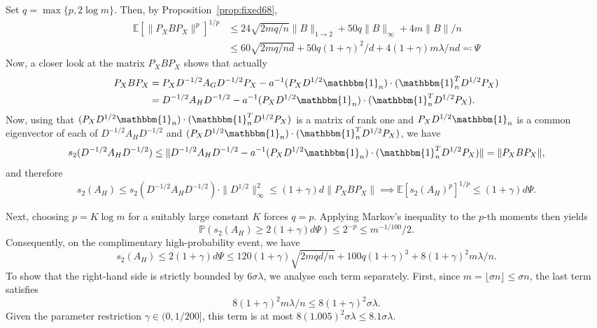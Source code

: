 \documentclass[reqno,a4paper]{amsart}
\theoremstyle{definition}
\begin{document}
Set $q = \max\{p,2\log m\}$. 
Then, by Proposition~\ref{prop:fixed68},
\[
\begin{split}
        \mathbb{E}[\|P_XBP_X\|^p]^{1/p}
        &\le
        24\sqrt{2mq/n}\|B\|_{1\to 2}+50q\|B\|_{\infty}+4m\|B\|/n\\
        &\le 60\sqrt{2mq/nd}+50q(1+\gamma)^2/d+4(1+\gamma)m\lambda/nd \eqqcolon \Psi
\end{split}
\]
Now, a closer look at the matrix $P_XB P_X$ shows that actually
\begin{align*}
P_XB P_X 
&= P_X D^{-1/2} A_G D^{-1/2} P_X - a^{-1} (P_X D^{1/2} \mathbbm{1}_n)\cdot (\mathbbm{1}_n^T D^{1/2} P_X)\\ 
&= D^{-1/2} A_H D^{-1/2} - a^{-1} (P_X D^{1/2} \mathbbm{1}_n)\cdot (\mathbbm{1}_n^T D^{1/2} P_X).
\end{align*}
Now, using that $(P_X D^{1/2} \mathbbm{1}_n)\cdot (\mathbbm{1}_n^T D^{1/2} P_X)$ is a matrix of rank one and $P_X D^{1/2} \mathbbm{1}_n$ is a common eigenvector of each of $D^{-1/2} A_H D^{-1/2}$ and $(P_X D^{1/2} \mathbbm{1}_n)\cdot (\mathbbm{1}_n^T D^{1/2} P_X)$, we have
\[s_2(D^{-1/2} A_H D^{-1/2})\le \|D^{-1/2} A_H D^{-1/2} - a^{-1} (P_X D^{1/2} \mathbbm{1}_n)\cdot (\mathbbm{1}_n^T D^{1/2} P_X)\| = \|P_XB P_X\|,\]
and therefore 
\[s_2(A_H)\le s_2(D^{-1/2} A_H D^{-1/2})\cdot \|D^{1/2}\|^2_{\infty} \le (1+\gamma) d \|P_XBP_X\| \implies \mathbb E[s_2(A_H)^p]^{1/p}\le (1+\gamma) d \Psi.\]

Next, choosing $p=K\log m$ for a suitably large constant $K$ forces $q = p$. 
Applying Markov's inequality to the $p$-th moments then yields
\[
        \mathbb{P}(s_2(A_H)\ge 2(1+\gamma) d \Psi)
        \le 2^{-p}
        \le m^{-1/100}/2.
\]
Consequently, on the complimentary high-probability event, we have
\begin{equation}\label{eq:s2-before-absorb}
        s_2(A_H)
        \le 2(1+\gamma) d \Psi
        \le 120(1+\gamma)\sqrt{2mqd/n}+100q(1+\gamma)^3+8(1+\gamma)^2m\lambda/n.
\end{equation}
To show that the right-hand side is strictly bounded by $6\sigma\lambda$, we analyse each term separately.
First, since $m = \lfloor \sigma n \rfloor \le \sigma n$, the last term satisfies
\[
8(1+\gamma)^2 m\lambda/n \le 8(1+\gamma)^2\sigma\lambda.
\]
Given the parameter restriction $\gamma \in (0, 1/200]$, this term is at most $8(1.005)^2\sigma\lambda\le 8.1\sigma\lambda$.
\end{document}

